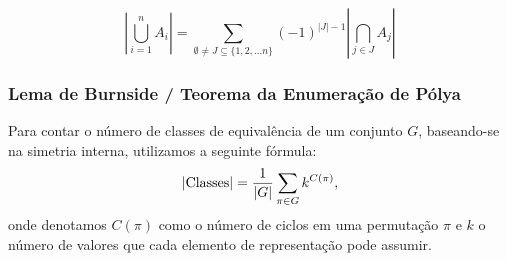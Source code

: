 $$|\bigcup_{i=1}^{n} A_i| = \sum_{\emptyset \neq J \subseteq \{1,2,...n\}}^{} (-1)^{|J|-1}|\bigcap_{j \in J}^{} A_j|$$

\subsubsection{Lema de Burnside / Teorema da Enumeração de Pólya}
Para contar o número de classes de equivalência de um conjunto $G$, baseando-se na simetria interna, utilizamos a seguinte fórmula:
$$|\textnormal{Classes}| = \frac{1}{|G|}\sum_{\pi \in G} k^{C(\pi)},$$
onde denotamos $C(\pi)$ como o número de ciclos em uma permutação $\pi$ e $k$ o número de valores que cada elemento de representação pode assumir.
